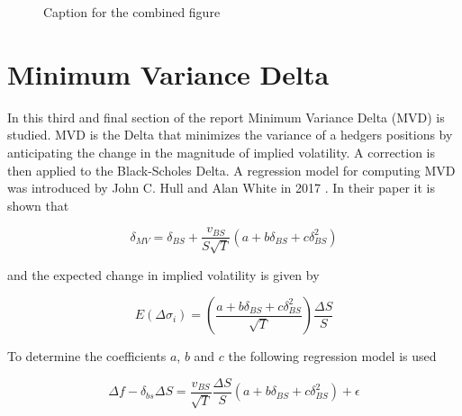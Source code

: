 \documentclass{article}
\begin{document}
\begin{figure}[h]
    \centering
    \hfill
    \caption{Caption for the combined figure}
    \label{fig:gamma}
\end{figure}
 
\newpage

\section{Minimum Variance Delta}

In this third and final section of the report Minimum Variance Delta (MVD) is studied. MVD is the Delta that minimizes the variance of a hedgers positions
by anticipating the change in the magnitude of implied volatility. A correction is then applied to the Black-Scholes Delta. 
A regression model for computing MVD was introduced by John C. Hull and Alan White in 2017 \cite{hull}. In their paper it is shown that 

\[
\delta_{MV} = \delta_{BS} + \frac{v_{BS}}{S \sqrt{T}} (a + b \delta_{BS} + c \delta_{BS}^2)
\]

and the expected change in implied volatility is given by

\[
E(\Delta \sigma_i) = \left ( \frac{a + b \delta_{BS} + c \delta_{BS}^2}{\sqrt{T}} \right ) \frac{\Delta S}{S}
\]

To determine the coefficients $a$, $b$ and $c$ the following regression model is used

\[
\Delta f - \delta_{bs} \Delta S = \frac{v_{BS}}{\sqrt{T}} \frac{\Delta S}{S} (a + b \delta_{BS} + c \delta_{BS}^2) + \epsilon
\]
\end{document}
